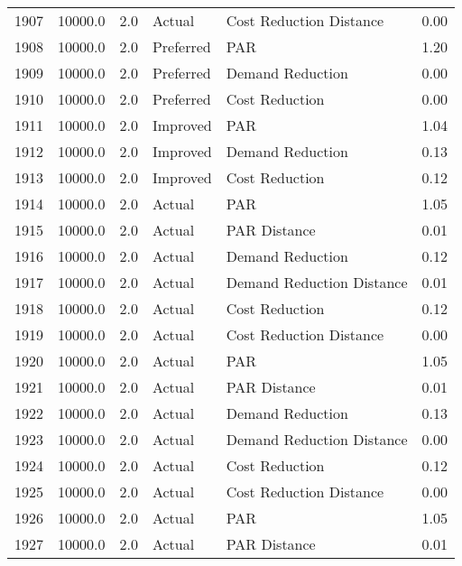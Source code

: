 \begin{longtable}{lrrllr}
1907 &      10000.0 &     2.0 &         Actual &    Cost Reduction Distance &   0.00 \\
1908 &      10000.0 &     2.0 &      Preferred &                        PAR &   1.20 \\
1909 &      10000.0 &     2.0 &      Preferred &           Demand Reduction &   0.00 \\
1910 &      10000.0 &     2.0 &      Preferred &             Cost Reduction &   0.00 \\
1911 &      10000.0 &     2.0 &       Improved &                        PAR &   1.04 \\
1912 &      10000.0 &     2.0 &       Improved &           Demand Reduction &   0.13 \\
1913 &      10000.0 &     2.0 &       Improved &             Cost Reduction &   0.12 \\
1914 &      10000.0 &     2.0 &         Actual &                        PAR &   1.05 \\
1915 &      10000.0 &     2.0 &         Actual &               PAR Distance &   0.01 \\
1916 &      10000.0 &     2.0 &         Actual &           Demand Reduction &   0.12 \\
1917 &      10000.0 &     2.0 &         Actual &  Demand Reduction Distance &   0.01 \\
1918 &      10000.0 &     2.0 &         Actual &             Cost Reduction &   0.12 \\
1919 &      10000.0 &     2.0 &         Actual &    Cost Reduction Distance &   0.00 \\
1920 &      10000.0 &     2.0 &         Actual &                        PAR &   1.05 \\
1921 &      10000.0 &     2.0 &         Actual &               PAR Distance &   0.01 \\
1922 &      10000.0 &     2.0 &         Actual &           Demand Reduction &   0.13 \\
1923 &      10000.0 &     2.0 &         Actual &  Demand Reduction Distance &   0.00 \\
1924 &      10000.0 &     2.0 &         Actual &             Cost Reduction &   0.12 \\
1925 &      10000.0 &     2.0 &         Actual &    Cost Reduction Distance &   0.00 \\
1926 &      10000.0 &     2.0 &         Actual &                        PAR &   1.05 \\
1927 &      10000.0 &     2.0 &         Actual &               PAR Distance &   0.01 \\

\end{longtable}
